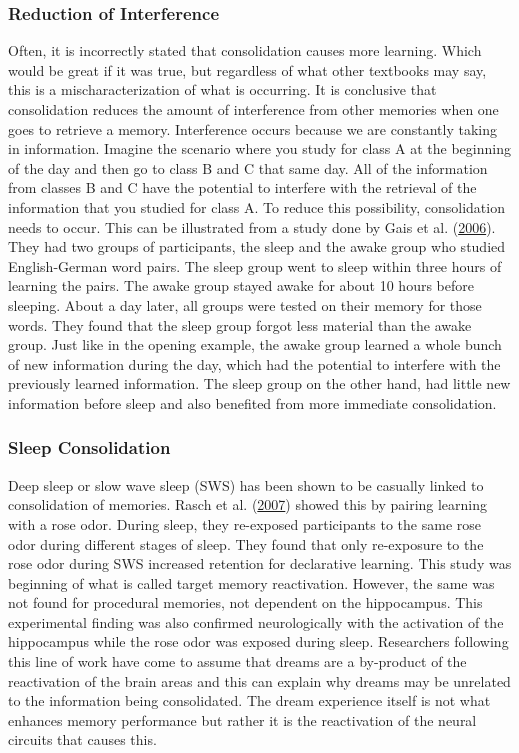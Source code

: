 \documentclass[
]{krantz}
\begin{document}
\hypertarget{reduction-of-interference}{%
\subsubsection*{Reduction of Interference}\label{reduction-of-interference}}


Often, it is incorrectly stated that consolidation causes more learning. Which would be great if it was true, but regardless of what other textbooks may say, this is a mischaracterization of what is occurring. It is conclusive that consolidation reduces the amount of interference from other memories when one goes to retrieve a memory. Interference occurs because we are constantly taking in information. Imagine the scenario where you study for class A at the beginning of the day and then go to class B and C that same day. All of the information from classes B and C have the potential to interfere with the retrieval of the information that you studied for class A. To reduce this possibility, consolidation needs to occur. This can be illustrated from a study done by Gais et al. (\protect\hyperlink{ref-Gais2006}{2006}). They had two groups of participants, the sleep and the awake group who studied English-German word pairs. The sleep group went to sleep within three hours of learning the pairs. The awake group stayed awake for about 10 hours before sleeping. About a day later, all groups were tested on their memory for those words. They found that the sleep group forgot less material than the awake group. Just like in the opening example, the awake group learned a whole bunch of new information during the day, which had the potential to interfere with the previously learned information. The sleep group on the other hand, had little new information before sleep and also benefited from more immediate consolidation.

\hypertarget{sleep-consolidation}{%
\subsubsection*{Sleep Consolidation}\label{sleep-consolidation}}


Deep sleep or slow wave sleep (SWS) has been shown to be casually linked to consolidation of memories. Rasch et al. (\protect\hyperlink{ref-Rasch2007}{2007}) showed this by pairing learning with a rose odor. During sleep, they re-exposed participants to the same rose odor during different stages of sleep. They found that only re-exposure to the rose odor during SWS increased retention for declarative learning. This study was beginning of what is called target memory reactivation. However, the same was not found for procedural memories, not dependent on the hippocampus. This experimental finding was also confirmed neurologically with the activation of the hippocampus while the rose odor was exposed during sleep. Researchers following this line of work have come to assume that dreams are a by-product of the reactivation of the brain areas and this can explain why dreams may be unrelated to the information being consolidated. The dream experience itself is not what enhances memory performance but rather it is the reactivation of the neural circuits that causes this.
\end{document}
